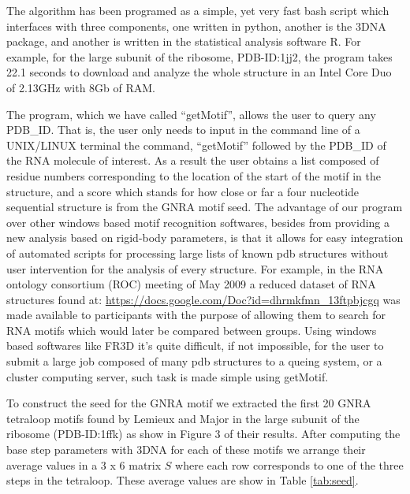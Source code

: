 The  algorithm has  been programed  as a  simple, yet  very  fast bash
script which interfaces with  three components, one written in python,
another is the 3DNA package, and another is written in the statistical
analysis  software R.   For  example,  for the  large  subunit of  the
ribosome, PDB-ID:1jj2, the program  takes 22.1 seconds to download and
analyze the whole  structure in an Intel Core Duo  of 2.13GHz with 8Gb
of RAM.

The  program, which  we have  called ``getMotif'',  allows the  user to
query any PDB\_ID. That is, the user only needs to input in the command
line of a UNIX/LINUX terminal the command, ``getMotif'' followed by the
PDB\_ID of the RNA molecule of interest. As a result the user obtains a
list composed of residue numbers  corresponding to the location of the
start of the motif in the  structure, and a score which stands for how
close or far  a four nucleotide sequential structure  is from the GNRA
motif seed.   The advantage  of our program  over other  windows based
motif  recognition softwares,  besides from  providing a  new analysis
based on rigid-body parameters, is that it allows for easy integration
of  automated  scripts  for   processing  large  lists  of  known  pdb
structures  without  user  intervention   for  the  analysis  of  every
structure. For  example, in the RNA ontology  consortium (ROC) meeting
of  May  2009   a  reduced  dataset  of  RNA   structures  found  at:
\url{https://docs.google.com/Doc?id=dhrmkfmn_13ftpbjcgq}    was   made
available to participants with the  purpose of allowing them to search
for RNA  motifs which  would later be  compared between  groups. Using
windows  based  softwares   like  FR3D  \cite{sarver2008}  it's  quite
difficult,  if not  impossible, for  the user  to submit  a  large job
composed  of many  pdb structures  to a  queing system,  or  a cluster
computing server, such task is made simple using getMotif.

To construct  the seed for  the GNRA motif  we extracted the  first 20
GNRA tetraloop motifs found by Lemieux and Major \cite{lemieux2006} in
the large subunit of the ribosome (PDB-ID:1ffk) as show in Figure 3 of
their results. After computing the  base step parameters with 3DNA for
each of these motifs we arrange their average values in a 3 x 6
matrix $S$ where each row corresponds to one of the three steps in the
tetraloop. These average values are show in Table \ref{tab:seed}.

